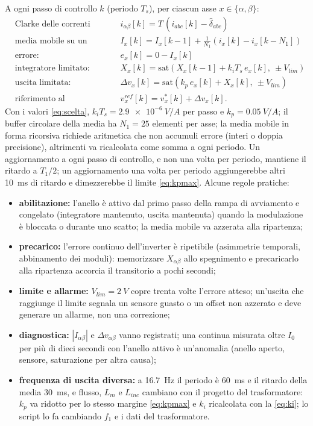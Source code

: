 \documentclass[10pt,a4paper]{scrartcl}
\newcommand{\Ts}{T_s}
\newcommand{\Tuno}{T_1}
\newcommand{\Lm}{L_m}
\newcommand{\Linc}{L_{inc}}
\newcommand{\Izero}{I_0}
\newcommand{\ab}{\alpha\beta}
\newcommand{\Iab}{I_{\ab}}
\newcommand{\dvab}{\Delta v_{\ab}}
\newcommand{\kp}{k_p}
\newcommand{\ki}{k_i}
\begin{document}
\begin{onehalfspace}
A ogni passo di controllo $k$ (periodo $\Ts$), per ciascun asse $x \in \{\alpha, \beta\}$:
\begin{equation}
\begin{aligned}
&\text{Clarke delle correnti campionate (offset dei sensori sottratto):} && i_{\ab}[k] = T\,(i_{abc}[k] - \hat\delta_{abc}) \\
&\text{media mobile su un periodo:} && I_x[k] = I_x[k-1] + \tfrac{1}{N_1}\left(i_x[k] - i_x[k-N_1]\right) \\
&\text{errore:} && e_x[k] = 0 - I_x[k] \\
&\text{integratore limitato:} && X_x[k] = \mathrm{sat}\!\left(X_x[k-1] + \ki\Ts\,e_x[k],\ \pm V_{lim}\right) \\
&\text{uscita limitata:} && \Delta v_x[k] = \mathrm{sat}\!\left(\kp\,e_x[k] + X_x[k],\ \pm V_{lim}\right) \\
&\text{riferimento al modulatore:} && v^{ref}_x[k] = v^*_x[k] + \Delta v_x[k].
\end{aligned}
\label{eq:discreto}
\end{equation}
Con i valori \eqref{eq:scelta}, $\ki\Ts = \SI{2.9e-6}{V/A}$ per passo e $\kp = \SI{0.05}{V/A}$; il buffer circolare della media ha $N_1 = 25$ elementi per asse; la media mobile in forma ricorsiva richiede aritmetica che non accumuli errore (interi o doppia precisione), altrimenti va ricalcolata come somma a ogni periodo. Un aggiornamento a ogni passo di controllo, e non una volta per periodo, mantiene il ritardo a $\Tuno/2$; un aggiornamento una volta per periodo aggiungerebbe altri \SI{10}{ms} di ritardo e dimezzerebbe il limite \eqref{eq:kpmax}. Alcune regole pratiche:
\begin{itemize}
\item \textbf{abilitazione:} l'anello è attivo dal primo passo della rampa di avviamento e congelato (integratore mantenuto, uscita mantenuta) quando la modulazione è bloccata o durante uno scatto; la media mobile va azzerata alla ripartenza;
\item \textbf{precarico:} l'errore continuo dell'inverter è ripetibile (asimmetrie temporali, abbinamento dei moduli): memorizzare $X_{\ab}$ allo spegnimento e precaricarlo alla ripartenza accorcia il transitorio a pochi secondi;
\item \textbf{limite e allarme:} $V_{lim} = \SI{2}{V}$ copre trenta volte l'errore atteso; un'uscita che raggiunge il limite segnala un sensore guasto o un offset non azzerato e deve generare un allarme, non una correzione;
\item \textbf{diagnostica:} $|\Iab|$ e $\dvab$ vanno registrati; una continua misurata oltre $\Izero$ per più di dieci secondi con l'anello attivo è un'anomalia (anello aperto, sensore, saturazione per altra causa);
\item \textbf{frequenza di uscita diversa:} a \SI{16.7}{Hz} il periodo è \SI{60}{ms} e il ritardo della media \SI{30}{ms}, e flusso, $\Lm$ e $\Linc$ cambiano con il progetto del trasformatore: $\kp$ va ridotto per lo stesso margine \eqref{eq:kpmax} e $\ki$ ricalcolata con la \eqref{eq:ki}; lo script lo fa cambiando $f_1$ e i dati del trasformatore.
\end{itemize}


\end{onehalfspace}
\end{document}
